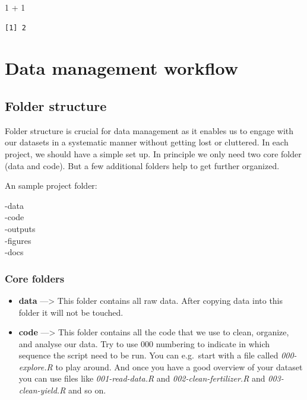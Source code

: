 \documentclass[
  letterpaper,
  DIV=11,
  numbers=noendperiod]{scrreprt}
\newenvironment{Shaded}{\begin{snugshade}}{\end{snugshade}}
\newcommand{\DecValTok}[1]{\textcolor[rgb]{0.68,0.00,0.00}{#1}}
\newcommand{\SpecialCharTok}[1]{\textcolor[rgb]{0.37,0.37,0.37}{#1}}
\begin{document}
\begin{Shaded}
\begin{Highlighting}[]
\DecValTok{1} \SpecialCharTok{+} \DecValTok{1}
\end{Highlighting}
\end{Shaded}

\begin{verbatim}
[1] 2
\end{verbatim}

\part{Data management workflow}

\hypertarget{folder-structure}{%
\chapter{Folder structure}\label{folder-structure}}

Folder structure is crucial for data management as it enables us to
engage with our datasets in a systematic manner without getting lost or
cluttered. In each project, we should have a simple set up. In principle
we only need two core folder (data and code). But a few additional
folders help to get further organized.

An sample project folder:

-data\\
-code\\
-outputs\\
-figures\\
-docs

\hypertarget{core-folders}{%
\section{Core folders}\label{core-folders}}

\begin{itemize}
\item
  \textbf{data} ---\textgreater{} This folder contains all raw data.
  After copying data into this folder it will not be touched.
\item
  \textbf{code} ---\textgreater{} This folder contains all the code that
  we use to clean, organize, and analyse our data. Try to use 000
  numbering to indicate in which sequence the script need to be run. You
  can e.g.~start with a file called \emph{000-explore.R} to play around.
  And once you have a good overview of your dataset you can use files
  like \emph{001-read-data.R} and \emph{002-clean-fertilizer.R} and
  \emph{003-clean-yield.R} and so on.
\end{itemize}
\end{document}
